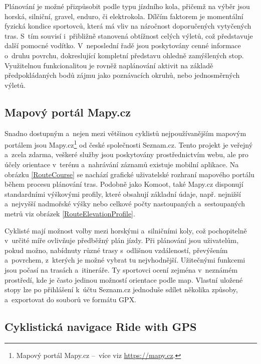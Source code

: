 
Plánování je možné přizpůsobit podle typu jízdního kola, přičemž na výběr jsou horská, silniční, gravel, enduro, či elektrokola.
Dílčím faktorem je momentální fyzická kondice sportovců, která má vliv na náročnost doporučených vytyčených tras.
S~tím souvisí i~přibližně stanovená obtížnost celých výletů, což představuje další pomocné vodítko.
V~neposlední řadě jsou poskytovány cenné informace o~druhu povrchu, dokreslující kompletní představu ohledně zamýšlených stop.
Využitelnou funkcionalitou je rovněž naplánování aktivit na základě předpokládaných bodů zájmu jako poznávacích okruhů, nebo jednosměrných výletů.

\subsection{Mapový portál Mapy.cz}
\label{mapy-cz-map-portal}

Snadno dostupným a~nejen mezi většinou cyklistů nejpoužívanějším mapovým portálem jsou Mapy.cz\footnote{Mapový portál Mapy.cz --~více viz \url{https://mapy.cz}.} od české společnosti Seznam.cz.
Tento projekt je veřejný a~zcela zdarma, veškeré služby jsou poskytovány prostřednictvím webu, ale pro účely orientace v~terénu a~nahrávání záznamů existuje mobilní aplikace.
Na obrázku \ref{RouteCourse} se nachází grafické uživatelské rozhraní mapového portálu během procesu plánování tras.
Podobně jako Komoot, také Mapy.cz disponují standardními výškovými profily, které obsahují základní údaje, např. nejnižší a~nejvyšší nadmořské výšky nebo celkové počty nastoupaných a~sestoupaných metrů viz obrázek \ref{RouteElevationProfile}.

Cyklisté mají možnost volby mezi horskými a~silničními koly, což pochopitelně v~určité míře ovlivňuje předběžný plán jízdy.
Při plánování jsou uživatelům, pokud možno, nabídnuty různé trasy s~odlišnou vzdáleností, převýšením a~povrchem, z~kterých je možné vybrat tu nejvhodnější.
Užitečnými funkcemi jsou počasí na trasách a~itineráře.
Ty sportovci ocení zejména v~neznámém prostředí, kde je často jedinou možností orientace podle map.
Vlastní uložené stopy lze po přihlášení k~účtu Seznam.cz jednoduše sdílet několika způsoby, a~exportovat do souborů ve formátu GPX.

\subsection{Cyklistická navigace Ride with GPS}
\label{ride-with-gps-cycling-navigation}

